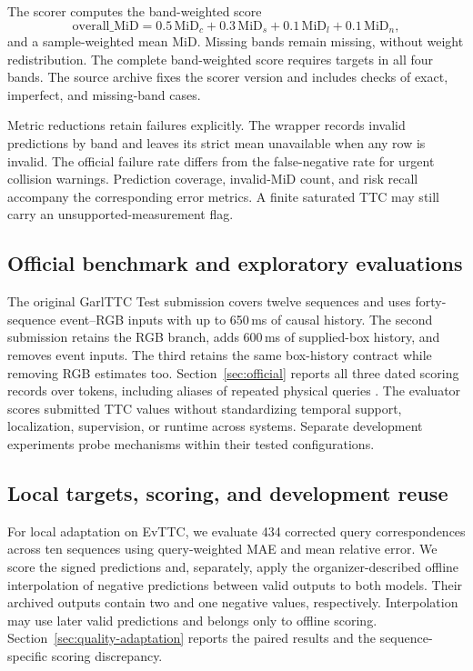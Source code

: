 The scorer computes the band-weighted score
\begin{equation}
 \mathrm{overall\_MiD}=0.5\,\mathrm{MiD}_{c}+0.3\,\mathrm{MiD}_{s}
                     +0.1\,\mathrm{MiD}_{l}+0.1\,\mathrm{MiD}_{n},
\end{equation}
and a sample-weighted mean MiD. Missing bands remain missing, without weight redistribution. The complete band-weighted score requires targets in all four bands. The source archive fixes the scorer version and includes checks of exact, imperfect, and missing-band cases. 

Metric reductions retain failures explicitly. The wrapper records invalid predictions by band and leaves its strict mean unavailable when any row is invalid. The official failure rate differs from the false-negative rate for urgent collision warnings. Prediction coverage, invalid-MiD count, and risk recall accompany the corresponding error metrics. A finite saturated TTC may still carry an unsupported-measurement flag.

\subsection{Official benchmark and exploratory evaluations}



The original GarlTTC Test submission covers twelve sequences and uses forty-sequence event--RGB inputs with up to 650\,ms of causal history. The second submission retains the RGB branch, adds 600\,ms of supplied-box history, and removes event inputs. The third retains the same box-history contract while removing RGB estimates too. Section~\ref{sec:official} reports all three dated scoring records over \OfficialSampleCount{} tokens, including aliases of repeated physical queries \citep{codabench2026}. The evaluator scores submitted TTC values without standardizing temporal support, localization, supervision, or runtime across systems. Separate development experiments probe mechanisms within their tested configurations. 

\subsection{Local targets, scoring, and development reuse}
For local adaptation on EvTTC, we evaluate 434 corrected query correspondences across ten sequences using query-weighted MAE and mean relative error. We score the signed predictions and, separately, apply the organizer-described offline interpolation of negative predictions between valid outputs to both models. Their archived outputs contain two and one negative values, respectively. Interpolation may use later valid predictions and belongs only to offline scoring. Section~\ref{sec:quality-adaptation} reports the paired results and the sequence-specific scoring discrepancy. 


